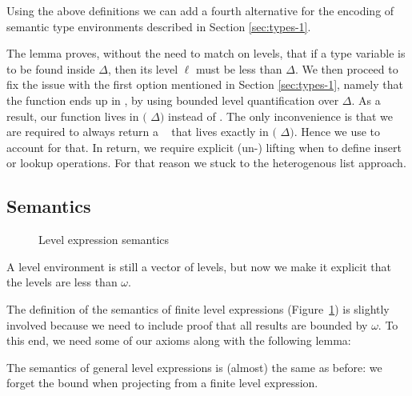 \documentclass[manuscript,screen,review,anonymous]{acmart}
\begin{document}
Using the above definitions we can add a fourth alternative for the 
encoding of semantic type environments described in Section \ref{sec:types-1}.

\SFVarLess
\SFFEnv

The lemma  proves, without the need to match on levels, that
if a type variable is to be found inside $\Delta$, then its level $\ell$ must be less than
 $\Delta$.
We then proceed to fix the issue with the first option mentioned in Section \ref{sec:types-1},
namely that the function ends up in , 
by using bounded level quantification over  $\Delta$.
As a result, our function lives in $($ $\Delta)$ 
instead of .
The only inconvenience is that we are required to always return a \ASet~
that lives exactly in $($ $\Delta)$.
Hence we use  to account for that.
In return, we require explicit (un-) lifting when to define insert or lookup operations.
For that reason we stuck to the heterogenous list approach.

\subsection{Semantics}
\label{sec:semantics-1}
\begin{figure}[tp]
  \begin{minipage}[t]{0.45\linewidth}
    \EHLSemFin
  \end{minipage}
  \begin{minipage}[t]{0.45\linewidth}
    \EHLSemAny
  \end{minipage}
  \caption{Level expression semantics}
  \label{fig:eh-semantics-level-expressions}
\end{figure}

A level environment is still a vector of levels, but now we make it
explicit that the levels are less than $\omega$.

\EHLEnvSem

The definition of the semantics of finite level expressions (Figure~\ref{fig:eh-semantics-level-expressions}) is
slightly involved because we need to include proof that all results
are bounded by $\omega$. To this end, we need some of our axioms along
with the following lemma:
\EHzeroLtomega

The semantics of general level expressions is (almost) the same as
before: we forget the bound when projecting from a finite level
expression. 
\end{document}
